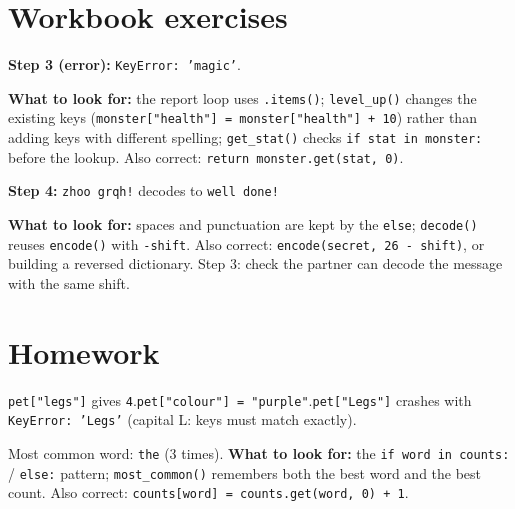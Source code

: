 
\section{Workbook exercises}
\begin{answer}
\textbf{Step 3 (error):} \texttt{KeyError: 'magic'}.\par
\textbf{What to look for:} the report loop uses \texttt{.items()}; \texttt{level\_up()} changes the existing keys
(\texttt{monster["health"] = monster["health"] + 10}) rather than adding keys with different spelling;
\texttt{get\_stat()} checks \texttt{if stat in monster:} before the lookup. Also correct: \texttt{return monster.get(stat, 0)}.
\end{answer}

\begin{answer}
\textbf{Step 4:} \texttt{zhoo grqh!} decodes to \texttt{well done!}\par
\textbf{What to look for:} spaces and punctuation are kept by the \texttt{else}; \texttt{decode()} reuses \texttt{encode()} with \texttt{-shift}.
Also correct: \texttt{encode(secret, 26 - shift)}, or building a reversed dictionary. Step 3: check the partner can decode the message
with the same shift.
\end{answer}

\section{Homework}
\begin{answer}
\texttt{pet["legs"]} gives \texttt{4}.\quad \texttt{pet["colour"] = "purple"}.\quad \texttt{pet["Legs"]} crashes with
\texttt{KeyError: 'Legs'} (capital L: keys must match exactly).
\end{answer}

\begin{answer}
Most common word: \texttt{the} (3 times).
\textbf{What to look for:} the \texttt{if word in counts:} / \texttt{else:} pattern; \texttt{most\_common()} remembers both the best word and the best count.
Also correct: \texttt{counts[word] = counts.get(word, 0) + 1}.
\end{answer}

